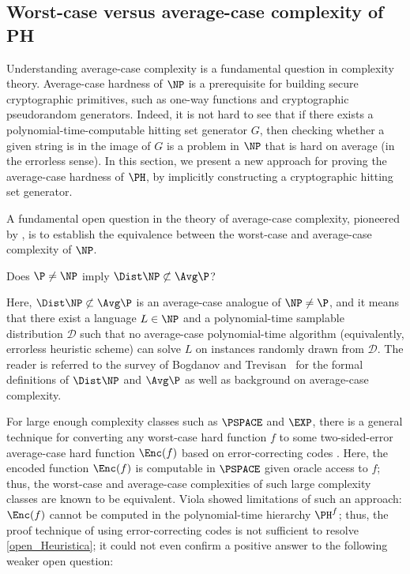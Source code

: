 \documentclass[11pt]{article}
\numberwithin{equation}{section}
\theoremstyle{definition}
\theoremstyle{plain}
\begin{document}
\subsection{Worst-case versus average-case complexity of PH}
\label{section_CryptographicHSG}

Understanding average-case complexity is a fundamental question
in complexity theory.
Average-case hardness of $\NP$ is a prerequisite for building secure cryptographic primitives,
such as one-way functions and cryptographic pseudorandom generators.
Indeed, it is not hard to see that if there exists a polynomial-time-computable hitting set generator $G$,
then checking whether a given string is in the image of $G$ is
a problem in $\NP$ that is hard on average (in the errorless sense).
In this section, we present a new approach for
proving the average-case hardness of $\PH$,
by implicitly
constructing a cryptographic hitting set generator.


A fundamental open question in the theory of average-case complexity, pioneered by \cite{Levin86_siamcomp_journals}, is
to establish the equivalence between the worst-case and average-case complexity of $\NP$.
\begin{open}
  \label{open_Heuristica}
  Does $\P \neq \NP$ imply $\Dist\NP \not\subset \Avg\P$?
\end{open}
Here, $\Dist\NP \not\subset \Avg\P$ is an average-case analogue of $\NP \neq \P$,
and it means that there exist a language $L \in \NP$ and a polynomial-time samplable distribution $\mathcal{D}$
such that no average-case polynomial-time algorithm (equivalently, errorless heuristic scheme) can solve $L$ on instances randomly drawn from $\mathcal{D}$.
%
%
%
The reader is referred to the survey of Bogdanov and Trevisan~\cite{BogdanovT06_siamcomp_journals} for the formal definitions of $\Dist\NP$ and $\Avg\P$
as well as background on average-case complexity.

For large enough complexity classes such as $\PSPACE$ and $\EXP$,
there is a general technique for converting any worst-case hard function $f$ to some two-sided-error average-case hard function $\Enc(f)$ based on error-correcting codes \cite{SudanTV01_jcss_journals, TrevisanV07_cc_journals}.
Here, the encoded function $\Enc(f)$ is computable in $\PSPACE$ given oracle access to $f$; thus, the worst-case and average-case
%
complexities  %
of such large complexity classes are known to be equivalent.
%
%
Viola \cite{Viola05_cc_journals} showed limitations of such an approach:
%
%
$\Enc(f)$ cannot be computed in
the polynomial-time hierarchy $\PH^f$; thus, the proof technique of using error-correcting codes is not sufficient to resolve \cref{open_Heuristica};
%
%
%
%
%
%
it could not even confirm a positive answer to  %
the following weaker open question:
\end{document}
